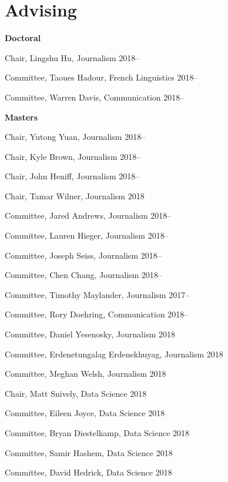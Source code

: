 
\section{Advising}

  \textbf{Doctoral}
    \begin{innerlist}
      \item Chair, Lingshu Hu, Journalism                            \hfill 2018--
      \item Committee, Taoues Hadour, French Linguistics             \hfill 2018--
      \item Committee, Warren Davis, Communication                   \hfill 2018--
    \end{innerlist}\vspace{1em}

  \textbf{Masters}
    \begin{innerlist}
      \item Chair, Yutong Yuan, Journalism                           \hfill 2018--
      \item Chair, Kyle Brown, Journalism                            \hfill 2018--
      \item Chair, John Heniff, Journalism                           \hfill 2018--
      \item Chair, Tamar Wilner, Journalism                          \hfill 2018
      \item Committee, Jared Andrews, Journalism                     \hfill 2018--
      \item Committee, Lauren Hieger, Journalism                     \hfill 2018--
      \item Committee, Joseph Seiss, Journalism                      \hfill 2018--
      \item Committee, Chen Chang, Journalism                        \hfill 2018--
      \item Committee, Timothy Maylander, Journalism                 \hfill 2017--
      \item Committee, Rory Doehring, Communication                  \hfill 2018--
      \item Committee, Daniel Yesenosky, Journalism                  \hfill 2018
      \item Committee, Erdenetungalag Erdenekhuyag, Journalism       \hfill 2018
      \item Committee, Meghan Welsh, Journalism                      \hfill 2018
      \item Chair, Matt Snively, Data Science                        \hfill 2018
      \item Committee, Eileen Joyce, Data Science                    \hfill 2018
      \item Committee, Bryan Diestelkamp, Data Science               \hfill 2018
      \item Committee, Samir Hashem, Data Science                    \hfill 2018
      \item Committee, David Hedrick, Data Science                   \hfill 2018
    \end{innerlist}\vspace{-.1in}
